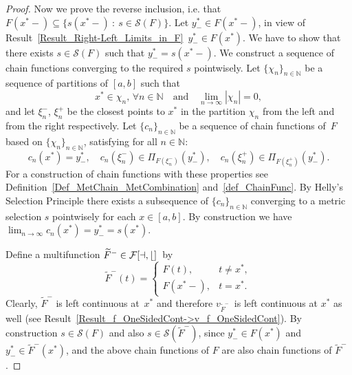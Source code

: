 \documentclass[final,3p,mathptmx]{article}%
\newcommand{\R}{{\mathbb R}}
\newcommand{\N}{{\mathbb N}}
\newcommand{\Rd}{{\R}^d}
\newcommand{\Comp}{\mathrm{K}(\Rd)}
\newcommand{\PrjXonY}[2]{\Pi_{#2}{(#1)} }
\newcommand{\calF}{\cal{F}[a,b]}
\newcommand{\setMS}{\mathcal{S}(F)}
\newcommand{\setMSof}[1]{\mathcal{S} ({#1})}
\begin{document}
{{{{\begin{proof}
		Now we prove the reverse inclusion, i.e. that  $F(x^*-) \subseteq \{s(x^*-) \ :\ s\in \mathcal{S}(F)\} $.
		Let $y^*_{-} \in F(x^*-)$, in view of Result~\ref{Result_Right-Left_Limits_in_F}\ $y^*_{-} \in F(x^*)$.  We have to show that there exists $ s \in \setMS$ such that $y^*_{-}=s(x^*-)$. %
		We construct a sequence of chain functions converging to the required $s$ pointwisely.  Let $\{\chi_n\}_{n\in \N}$ be a sequence of partitions of $[a,b]$ such that
		$$ 
		x^* \in \chi_n,\, \forall n \in\N \quad \text{and} \quad  \lim_{n \to \infty} |\chi_{n}| =0,
		$$ 
		and let $\xi_n^{-}$, $\xi_n^{+}$ be the closest points to $x^*$ in the partition $\chi_n$ from the left and from the right respectively.		
		Let $\{c_n\}_{n \in \N}$ be a sequence of chain functions of~$F$ based on $\{\chi_n\}_{n\in \N}$, 
		satisfying for all $n \in \N$: 
		$$
		c_n(x^*)=y^*_{-} ,  \quad c_n(\xi_n^{-}) \in  \PrjXonY{y^*_{-}}{F(\xi_n^{-})} ,  
		\quad c_n(\xi_n^{+}) \in  \PrjXonY{y^*_{-}}{F(\xi_n^{+})}.
		$$
		For a construction of chain functions with these properties see Definition~\ref{Def_MetChain_MetCombination} and~\eqref{def_ChainFunc}.
		By Helly's Selection Principle there exists a subsequence of $\{c_n\}_{n \in \N}$ converging to a metric selection $s$ pointwisely for each $x\in[a, b]$. %
		By construction we have ${\displaystyle \lim_{n \to \infty} c_n(x^*) = y^*_{-} = s(x^*) }$.
		
		Define a multifunction ${\widetilde F^{-} \in \calF}$~by %
		$$
		\widetilde F^{-} (t) =
		\left \{ \begin{array}{ll}
			F(t), & t \neq x^*, \\
			F(x^*-), & t=x^*.
		\end{array}
		\right.
		$$
		Clearly,  $\widetilde F^{-}$ is left continuous at~$x^*$ and therefore $v_{\widetilde F^{-}}$\  is left continuous at $x^*$ as well (see Result~\ref{Result_f_OneSidedCont->v_f_OneSidedCont}). By construction $s \in  \setMSof{F}$ and also $s \in  \setMSof{\widetilde F^{-}}$, since $y^*_{-} \in F(x^*)$ and $y^*_{-} \in 	\widetilde F^{-}(x^*)$, and the above chain functions of $F$ are also chain functions of $\widetilde F^{-}$.
			

\end{proof}}}}}
\end{document}
